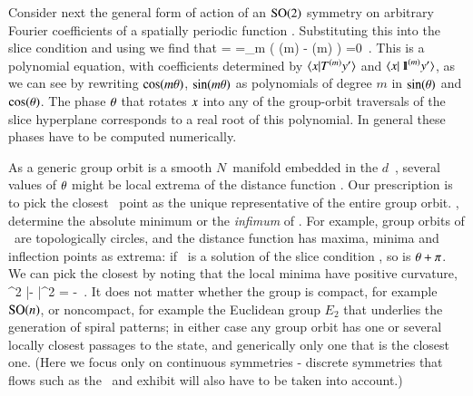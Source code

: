 \documentclass[preprint,12pt]{elsarticle} %
\begin{document}
Consider next the general form  of action of an
$\textrm{SO}(2)$ symmetry on arbitrary Fourier coefficients of a spatially
periodic function . Substituting this into the slice
condition  and using  we find that
\bea
{}
=
\continue
=\sum\limits_m
   \left(
     \cos(m\gSpace)
  -  \sin(m\gSpace)
   \right)
   =0
\,.
\label{eq:so2sing}
\eea
This is a polynomial equation, with coefficients determined by
$\braket{\ssp}{\Lg^{(m)} \slicep}$ and $\braket{\ssp}{\id^{(m)}\slicep}$,
as we can see by rewriting $\cos(m{\bf \theta})$, $\sin(m{\bf \theta})$ as
polynomials of degree $m$ in $\sin({\bf \theta})$ and $\cos({\bf \theta})$. The
phase ${\bf \theta}$ that rotates $x$ into any of the group-orbit
traversals of the slice hyperplane corresponds to a real root of this
polynomial. In general these phases have to be computed numerically.

As a generic group orbit is a smooth $N$\dmn\ manifold embedded in the
$d$\dmn\ \statesp, several values of ${\bf \theta}$ might be local extrema of
the distance function .
Our prescription is to pick the closest \reducedsp\ point as the unique
representative of the entire group orbit. \ie, determine the absolute
minimum or the \emph{infimum} of .
For example, group orbits of
\ are topologically circles, and the distance function
 has maxima, minima and inflection points as extrema:
if \gSpace\ is a solution of the slice condition ,
so is ${\bf \theta}+\pi$. We can pick the closest by noting that
the local minima have positive curvature,
\beq
{}
     {\partial \gSpace^2}
        |\sspRed - \slicep|^2
    =
-  \braket{\sspRed}{\Lg^2\slicep}
\,.
It does not matter
whether the group is compact, for example $\textrm{SO}(n)$, or noncompact, for
example the Euclidean group $E_2$ that underlies the generation of spiral
patterns; in either case any group orbit has one or several
locally closest passages to the {\template} state, and generically only
one that is the closest one.
(Here we focus only on continuous symmetries - discrete symmetries that
flows such as the \KS\ and {\pCf} exhibit will also have to be taken into
account.)
\end{document}
